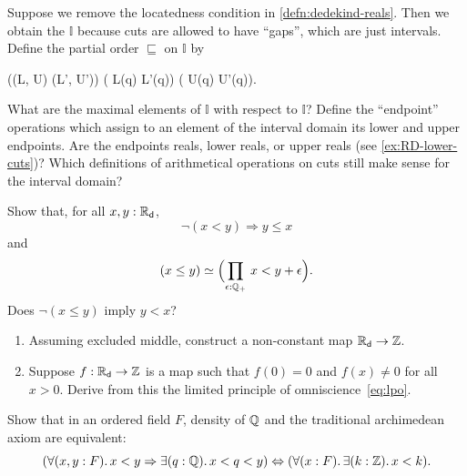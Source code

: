\begin{ex} \label{ex:RD-interval-arithmetic}
  Suppose we remove the locatedness condition in \cref{defn:dedekind-reals}.
  Then we obtain the 
  $\mathbb{I}$ because cuts are allowed
  to have ``gaps'', which are just intervals. Define the partial order $\sqsubseteq$ on
  $\mathbb{I}$ by
  \begin{narrowmultline*}
    ((L, U) \sqsubseteq (L', U'))
     \narrowbreak
    ( L(q) \Rightarrow L'(q)) \land
    ( U(q) \Rightarrow U'(q)).
  \end{narrowmultline*}
  What are the maximal elements of $\mathbb{I}$ with respect to $\mathbb{I}$? Define the
  ``endpoint'' operations which assign to an element of the interval domain its lower and
  upper endpoints. Are the endpoints reals, lower reals, or upper reals (see
  \cref{ex:RD-lower-cuts})? Which definitions of arithmetical operations on cuts still
  make sense for the interval domain?
\end{ex}

\begin{ex} \label{ex:RD-lt-vs-le}
  Show that, for all $x, y : \mathbb{R}_\mathsf{d}$,
  \begin{equation*}
    \lnot (x < y) \Rightarrow y \leq x
  \end{equation*}
  and
  \begin{equation*}
    \eqv{(x \leq y)}{\Parens{\prd{\epsilon : \Qp} x < y + \epsilon}}.
  \end{equation*}
  Does $\lnot (x \leq y)$ imply $y < x$?
\end{ex}

\begin{ex} \label{ex:reals-non-constant-into-Z}
  \mbox{}
  \begin{enumerate}
  \item
    Assuming excluded middle, construct a non-constant map $\mathbb{R}_\mathsf{d} \to \mathbb{Z}$.
  \item
    Suppose $f : \mathbb{R}_\mathsf{d} \to \mathbb{Z}$ is a map such that $f(0) = 0$ and $f(x) \neq 0$ for all $x >
    0$. Derive from this the limited principle of omniscience~\eqref{eq:lpo}.
%
  \end{enumerate}
\end{ex}

\begin{ex} \label{ex:traditional-archimedean}
  Show that in an ordered field $F$, density of $\mathbb{Q}$ and the traditional archimedean axiom
  are equivalent:
  \begin{equation*}
    (\fall{x, y : F} x < y \Rightarrow \exis{q : \Q} x < q < y)
    \Leftrightarrow
    (\fall{x : F} \exis{k : \Z} x < k).
  \end{equation*}
\end{ex}

